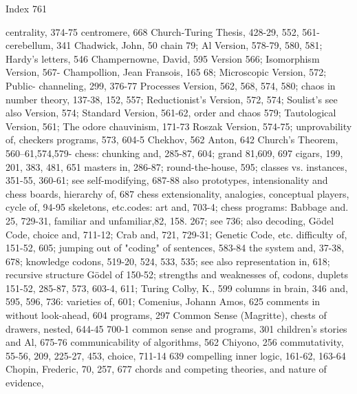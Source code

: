 Index                                                                                761

centrality, 374-75 centromere, 668            Church-Turing Thesis, 428-29, 552, 561-
cerebellum, 341 Chadwick, John, 50 chain      79; Al Version, 578-79, 580, 581; Hardy's
letters, 546 Champernowne, David, 595         Version 566; Isomorphism Version, 567-
Champollion,        Jean    Fransois,  165    68; Microscopic Version, 572; Public-
channeling, 299, 376-77                       Processes Version, 562, 568, 574, 580;
chaos in number theory, 137-38, 152, 557;     Reductionist's Version, 572, 574; Soulist's
see also                                      Version, 574; Standard Version, 561-62,
order and chaos                               579; Tautological Version, 561; The odore
chauvinism, 171-73                            Roszak Version, 574-75; unprovability of,
checkers programs, 573, 604-5 Chekhov,        562
Anton, 642                                    Church's     Theorem,       560--61,574,579-
chess: chunking and, 285-87, 604; grand       81,609, 697 cigars, 199, 201, 383, 481, 651
masters in, 286-87; round-the-house, 595;     classes vs. instances, 351-55, 360-61; see
self-modifying, 687-88                        also    prototypes,     intensionality   and
chess boards, hierarchy of, 687 chess         extensionality,     analogies,    conceptual
players, cycle of, 94-95                      skeletons, etc.codes: art and, 703-4;
chess programs: Babbage and. 25, 729-31,      familiar and unfamiliar,82, 158. 267; see
736;                                          also decoding, Gödel Code,
choice and, 711-12; Crab and, 721, 729-31;    Genetic Code, etc.
difficulty of, 151-52, 605; jumping out of    "coding" of sentences, 583-84
the system and, 37-38, 678; knowledge         codons, 519-20, 524, 533, 535; see also
representation in, 618; recursive structure   Gödel
of 150-52; strengths and weaknesses of,       codons, duplets
151-52, 285-87, 573, 603-4, 611; Turing       Colby, K., 599 columns in brain, 346
and, 595, 596, 736: varieties of, 601;        Comenius, Johann Amos, 625 comments in
without look-ahead, 604                       programs, 297 Common Sense (Magritte),
chests of drawers, nested, 644-45             700-1 common sense and programs, 301
children's stories and Al, 675-76             communicability of algorithms, 562
Chiyono, 256                                  commutativity, 55-56, 209, 225-27, 453,
choice, 711-14                                639 compelling inner logic, 161-62, 163-64
Chopin, Frederic, 70, 257, 677 chords and     competing theories, and nature of evidence,
